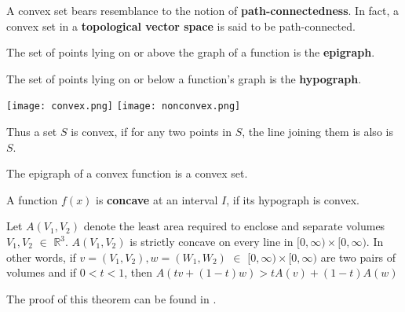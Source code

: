\documentclass[a4paper,12pt]{report}
\begin{document}
\begin{remark}
A convex set bears resemblance to the notion of \textbf{path-connectedness}. In fact, a convex set in a \textbf{topological vector space} is said to be path-connected.
\end{remark}

\begin{definition}
The set of points lying on or above the graph of a function is the \textbf{epigraph}.
\end{definition}

\begin{definition}
The set of points lying on or below a function's graph is the \textbf{hypograph}.
\end{definition}

\begin{center}
\texttt{[image: convex.png]}
\hspace{4cm}
\texttt{[image: nonconvex.png]}
\vspace{-1cm}
\begin{multicols}{2}
\vspace{1cm}
\end{multicols}
\end{center}

Thus a set $S$ is convex, if for any two points in $S$, the line joining them is also is $S$.

\begin{remark}
The epigraph of a convex function is a convex set.
\end{remark}

\begin{definition}
A function $f(x)$ is \textbf{concave} at an interval $I$, if its hypograph is convex.
\end{definition}

\begin{theorem}
Let $A(V_{1},V_{2})$ denote the least area required to enclose and separate volumes $V_{1}, V_{2}$ $\in$ $\mathbb{R}^{3}$. $A(V_{1}, V_{2})$ is strictly concave on every line in $[0, \infty) \times [0,\infty)$. In other words, if $v = (V_{1},V_{2}), w = (W_{1},W_{2})$ $\in$ $[0,\infty) \times [0,\infty)$ are two pairs of volumes and if $0 < t < 1$, then $A(tv + (1-t)w) > tA(v) + (1-t)A(w)$
\end{theorem}

The proof of this theorem can be found in \cite{hutchings}.
\end{document}
